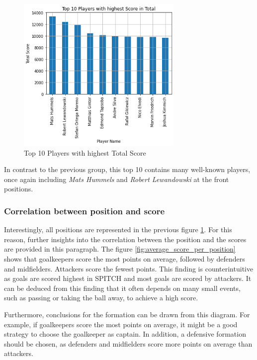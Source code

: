 \begin{figure}[H]
    \centering
    \includegraphics[width=8cm]{chapter/4_implementation/section/2_data/section/figures/top_10_player_total_score.png}
    \captionsetup{justification=centering}
    \caption{Top 10 Players with highest Total Score}
    \label{fig:top_10_player_total_score}
\end{figure}

In contrast to the previous group, this top 10 contains many well-known players, once again including \emph{Mats Hummels} and \emph{Robert Lewandowski} at the front positions.

\subsubsection{Correlation between position and score}

Interestingly, all positions are represented in the previous figure \ref{fig:top_10_player_total_score}. For this reason, further insights into the correlation between the position and the scores are provided in this paragraph. The figure \ref{fig:average_score_per_position} shows that goalkeepers score the most points on average, followed by defenders and midfielders. Attackers score the fewest points. This finding is counterintuitive as goals are scored highest in SPITCH and most goals are scored by attackers. It can be deduced from this finding that it often depends on many small events, such as passing or taking the ball away, to achieve a high score. 

Furthermore, conclusions for the formation can be drawn from this diagram. For example, if goalkeepers score the most points on average, it might be a good strategy to choose the goalkeeper as captain. In addition, a defensive formation should be chosen, as defenders and midfielders score more points on average than attackers. 

